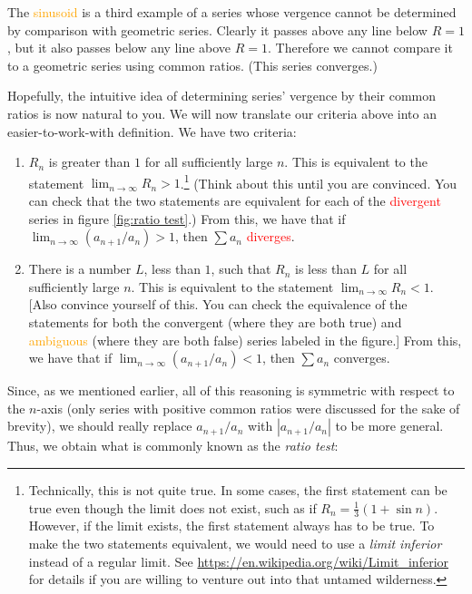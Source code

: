 \documentclass{myarticle}
\theoremstyle{nospace}
\newtheorem{old series theorem}{Theorem}
\newenvironment{series theorem}
{\begin{mdframed}\begin{old series theorem}}
    {\end{old series theorem}\end{mdframed}}
\begin{document}
The \textcolor{orange}{sinusoid} is a third example of a series whose
vergence cannot be determined by comparison with geometric series.
Clearly it passes above any line below $R = 1$, but it also passes
below any line above $R = 1$. Therefore we cannot compare it to a
geometric series using common ratios. (This series converges.)

Hopefully, the intuitive idea of determining series' vergence by their
common ratios is now natural to you. We will now translate our
criteria above into an easier-to-work-with definition. We have two
criteria:
\begin{enumerate}
\item $R_n$ is greater than $1$ for all sufficiently large $n$. This
  is equivalent to the statement
  $\lim_{n \to \infty} R_n > 1$.\footnote{Technically, this is not
    quite true. In some cases, the first statement can be true even
    though the limit does not exist, such as if
    $R_n = \frac{1}{3}(1 + \sin n)$. However, if the limit exists, the
    first statement always has to be true. To make the two statements
    equivalent, we would need to use a \emph{limit inferior} instead
    of a regular limit. See
    \url{https://en.wikipedia.org/wiki/Limit_inferior} for details if
    you are willing to venture out into that untamed wilderness.}
  (Think about this until you are convinced. You can check that the
  two statements are equivalent for each of the
  \textcolor{red}{divergent} series in figure \ref{fig:ratio test}.)
  From this, we have that if $\lim_{n \to \infty} (a_{n+1}/a_n) > 1$,
  then $\sum a_n$ \textcolor{red}{diverges}.
\item There is a number $L$, less than $1$, such that $R_n$ is less
  than $L$ for all sufficiently large $n$. This is equivalent to the
  statement $\lim_{n \to \infty} R_n < 1$. [Also convince yourself of
  this. You can check the equivalence of the statements for both the
  \textcolor{nicegreen}{convergent} (where they are both true) and
  \textcolor{orange}{ambiguous} (where they are both false) series
  labeled in the figure.] From this, we have that if
  $\lim_{n \to \infty} (a_{n+1}/a_n) < 1$, then $\sum a_n$
  \textcolor{nicegreen}{converges}.
\end{enumerate}

Since, as we mentioned earlier, all of this reasoning is symmetric
with respect to the $n$-axis (only series with positive common ratios
were discussed for the sake of brevity), we should really replace
$a_{n+1}/a_n$ with $|a_{n+1}/a_n|$ to be more general. Thus, we obtain
what is commonly known as the \emph{ratio test}:
\end{document}

